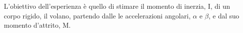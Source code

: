L'obiettivo dell'esperienza è quello di stimare il momento di inerzia, I, di un corpo rigido, il volano, partendo dalle le accelerazioni angolari, $\alpha$ e $\beta$, e dal suo momento d'attrito, M.
